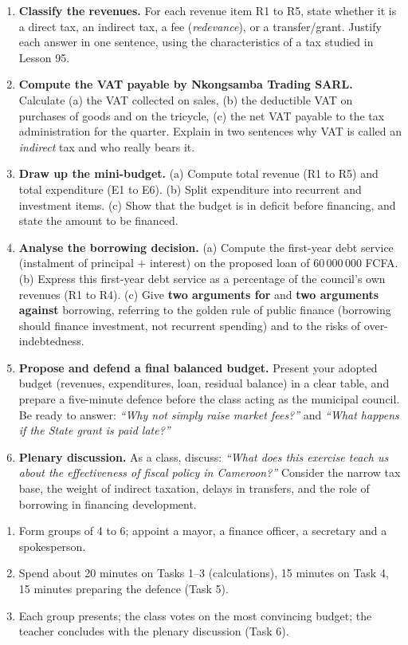 \documentclass[11pt]{article}
\begin{document}
\begin{enumerate}
\item \textbf{Classify the revenues.} For each revenue item R1 to R5, state whether it is a direct tax, an indirect tax, a fee (\emph{redevance}), or a transfer/grant. Justify each answer in one sentence, using the characteristics of a tax studied in Lesson 95.
\item \textbf{Compute the VAT payable by Nkongsamba Trading SARL.} Calculate (a) the VAT collected on sales, (b) the deductible VAT on purchases of goods and on the tricycle, (c) the net VAT payable to the tax administration for the quarter. Explain in two sentences why VAT is called an \emph{indirect} tax and who really bears it.
\item \textbf{Draw up the mini-budget.} (a) Compute total revenue (R1 to R5) and total expenditure (E1 to E6). (b) Split expenditure into recurrent and investment items. (c) Show that the budget is in deficit before financing, and state the amount to be financed.
\item \textbf{Analyse the borrowing decision.} (a) Compute the first-year debt service (instalment of principal $+$ interest) on the proposed loan of $60\,000\,000$ FCFA. (b) Express this first-year debt service as a percentage of the council's own revenues (R1 to R4). (c) Give \textbf{two arguments for} and \textbf{two arguments against} borrowing, referring to the golden rule of public finance (borrowing should finance investment, not recurrent spending) and to the risks of over-indebtedness.
\item \textbf{Propose and defend a final balanced budget.} Present your adopted budget (revenues, expenditures, loan, residual balance) in a clear table, and prepare a five-minute defence before the class acting as the municipal council. Be ready to answer: \emph{``Why not simply raise market fees?''} and \emph{``What happens if the State grant is paid late?''}
\item \textbf{Plenary discussion.} As a class, discuss: \emph{``What does this exercise teach us about the effectiveness of fiscal policy in Cameroon?''} Consider the narrow tax base, the weight of indirect taxation, delays in transfers, and the role of borrowing in financing development.
\end{enumerate}

\begin{methode}
\begin{enumerate}
\item Form groups of 4 to 6; appoint a mayor, a finance officer, a secretary and a spokesperson.
\item Spend about 20 minutes on Tasks 1--3 (calculations), 15 minutes on Task 4, 15 minutes preparing the defence (Task 5).
\item Each group presents; the class votes on the most convincing budget; the teacher concludes with the plenary discussion (Task 6).
\end{enumerate}
\end{methode}
\end{document}
